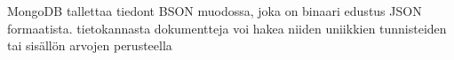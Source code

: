 MongoDB tallettaa tiedont BSON muodossa, joka on binaari edustus JSON formaatista.
tietokannasta dokumentteja voi hakea niiden uniikkien tunnisteiden tai sisällön arvojen perusteella
\medskip
\fi


















    





